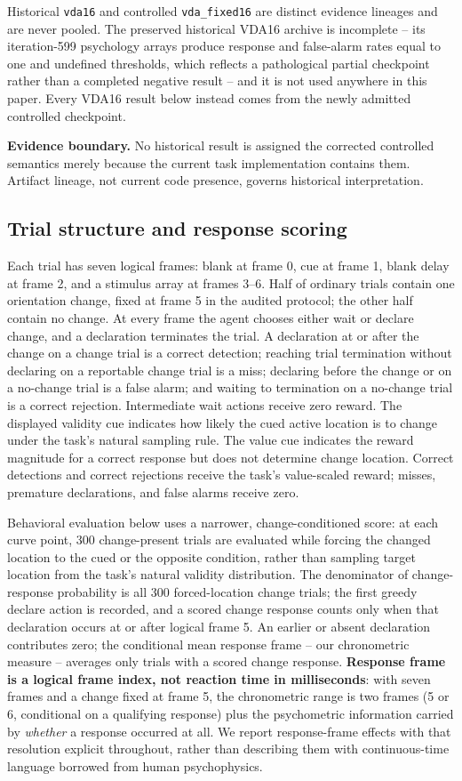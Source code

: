 \documentclass[11pt,a4paper]{article}
\newcommand{\boundary}[1]{\par\smallskip\noindent\colorbox{VdaLight}{\parbox{0.96\linewidth}{\textbf{Evidence boundary.} #1}}\par\smallskip}
\newcommand{\env}[1]{\texttt{#1}}
\begin{document}
Historical \env{vda16} and controlled \env{vda\_fixed16} are distinct evidence lineages and are never pooled. The preserved historical VDA16 archive is incomplete -- its iteration-599 psychology arrays produce response and false-alarm rates equal to one and undefined thresholds, which reflects a pathological partial checkpoint rather than a completed negative result -- and it is not used anywhere in this paper. Every VDA16 result below instead comes from the newly admitted controlled checkpoint. \boundary{No historical result is assigned the corrected controlled semantics merely because the current task implementation contains them. Artifact lineage, not current code presence, governs historical interpretation.}

\subsection{Trial structure and response scoring}\label{sec:trial-structure}
Each trial has seven logical frames: blank at frame 0, cue at frame 1, blank delay at frame 2, and a stimulus array at frames 3--6. Half of ordinary trials contain one orientation change, fixed at frame 5 in the audited protocol; the other half contain no change. At every frame the agent chooses either wait or declare change, and a declaration terminates the trial. A declaration at or after the change on a change trial is a correct detection; reaching trial termination without declaring on a reportable change trial is a miss; declaring before the change or on a no-change trial is a false alarm; and waiting to termination on a no-change trial is a correct rejection. Intermediate wait actions receive zero reward. The displayed validity cue indicates how likely the cued active location is to change under the task's natural sampling rule. The value cue indicates the reward magnitude for a correct response but does not determine change location. Correct detections and correct rejections receive the task's value-scaled reward; misses, premature declarations, and false alarms receive zero.

Behavioral evaluation below uses a narrower, change-conditioned score: at each curve point, 300 change-present trials are evaluated while forcing the changed location to the cued or the opposite condition, rather than sampling target location from the task's natural validity distribution. The denominator of change-response probability is all 300 forced-location change trials; the first greedy declare action is recorded, and a scored change response counts only when that declaration occurs at or after logical frame 5. An earlier or absent declaration contributes zero; the conditional mean response frame -- our chronometric measure -- averages only trials with a scored change response. \textbf{Response frame is a logical frame index, not reaction time in milliseconds}: with seven frames and a change fixed at frame 5, the chronometric range is two frames (5 or 6, conditional on a qualifying response) plus the psychometric information carried by \emph{whether} a response occurred at all. We report response-frame effects with that resolution explicit throughout, rather than describing them with continuous-time language borrowed from human psychophysics.
\end{document}
